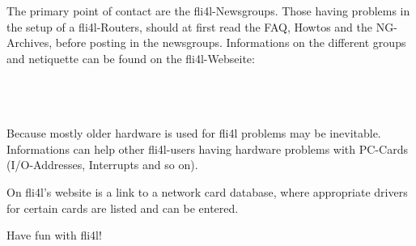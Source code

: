     The primary point of contact are the fli4l-Newsgroups. Those having problems
    in the setup of a fli4l-Routers, should at first read the FAQ, Howtos and the 
    NG-Archives, before posting in the newsgroups. Informations on the
    different groups and netiquette can be found on the fli4l-Webseite:

           \\
    \indent{}\\
    \indent{}\\

    Because mostly older hardware is used for fli4l problems may be
    inevitable. Informations can help other fli4l-users having hardware
    problems with PC-Cards (I/O-Addresses, Interrupts and so on).

    On fli4l's website is a link to a network card database, where
    appropriate drivers for certain cards are listed and can be entered.


    \bigskip

    Have fun with fli4l!
